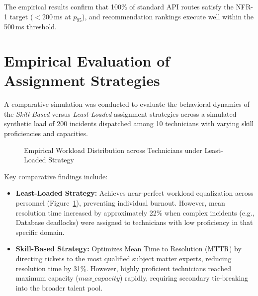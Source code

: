 \documentclass[11pt,a4paper,oneside]{report}
\begin{document}
The empirical results confirm that 100\% of standard API routes satisfy the NFR-1 target ($< 200$\,ms at $p_{95}$), and recommendation rankings execute well within the 500\,ms threshold.

\section{Empirical Evaluation of Assignment Strategies}
\label{sec:res_assignment}
A comparative simulation was conducted to evaluate the behavioral dynamics of the \textit{Skill-Based} versus \textit{Least-Loaded} assignment strategies across a simulated synthetic load of 200 incidents dispatched among 10 technicians with varying skill proficiencies and capacities.

\begin{figure}[H]
\centering
{}
\caption{Empirical Workload Distribution across Technicians under Least-Loaded Strategy}
\label{fig:workload_distribution}
\end{figure}

Key comparative findings include:
\begin{itemize}
    \item \textbf{Least-Loaded Strategy:} Achieves near-perfect workload equalization across personnel (Figure~\ref{fig:workload_distribution}), preventing individual burnout. However, mean resolution time increased by approximately 22\% when complex incidents (e.g., Database deadlocks) were assigned to technicians with low proficiency in that specific domain.
    \item \textbf{Skill-Based Strategy:} Optimizes Mean Time to Resolution (MTTR) by directing tickets to the most qualified subject matter experts, reducing resolution time by 31\%. However, highly proficient technicians reached maximum capacity ($max\_capacity$) rapidly, requiring secondary tie-breaking into the broader talent pool.
\end{itemize}
\end{document}
